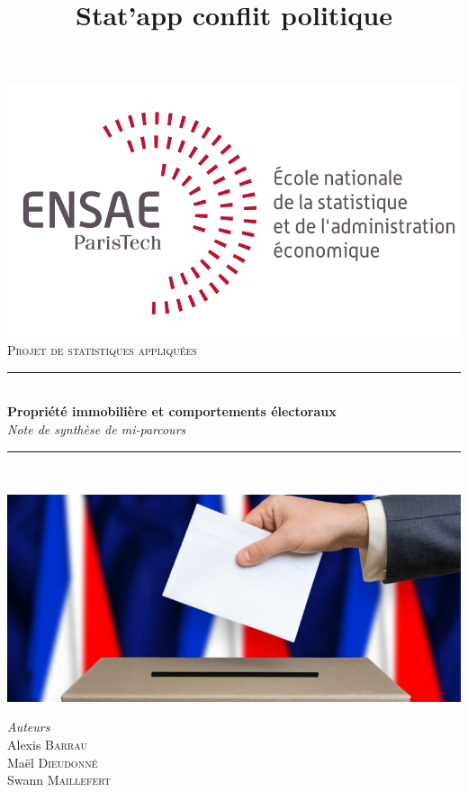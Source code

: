 \documentclass[a4paper,14pt]{article}
\title{Stat'app conflit politique}
\begin{document}
\begin{titlepage}

\newcommand{\HRule}{\rule{\linewidth}{0.5mm}}

\center

\includegraphics[scale=1.0]{ensae_logo_dev.png}\\[1cm]
\textsc{\Large Projet de statistiques appliquées}\\[0.5cm]

\HRule \\[0.4cm]
{ \huge \bfseries Propriété immobilière et comportements électoraux}\\[0.4cm]
\emph{\Large Note de synthèse de mi-parcours}\\[0.1cm]
\HRule \\[0.6cm]
\begin{center}
\includegraphics[scale=0.7]{Vote_image.jpg} 
\end{center}
\vspace{1cm}

\begin{minipage}{0.4\textwidth}
\begin{flushleft} \large
\emph{Auteurs}\\
Alexis \textsc{Barrau}\\
Maël \textsc{Dieudonné}\\
Swann \textsc{Maillefert}\\
\end{flushleft}
\end{minipage}\\[1cm]


\end{titlepage}
\end{document}
